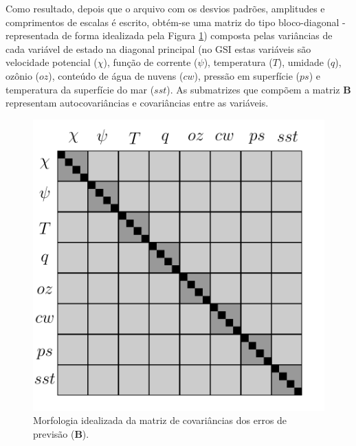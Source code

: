 Como resultado, depois que o arquivo com os desvios padrões, amplitudes e comprimentos de escalas é escrito, obtém-se uma matriz do tipo bloco-diagonal - representada de forma idealizada pela Figura \ref{fig:1}) composta pelas variâncias de cada variável de estado na diagonal principal (no GSI estas variáveis são velocidade potencial ($\chi$), função de corrente ($\psi$), temperatura ($T$), umidade ($q$), ozônio ($oz$), conteúdo de água de nuvens ($cw$), pressão em superfície ($ps$) e temperatura da superfície do mar ($sst$). As submatrizes que compõem a matriz $\mathbf{B}$ representam autocovariâncias e covariâncias entre as variáveis.

\begin{figure}[H]
\caption{Morfologia idealizada da matriz de covariâncias dos erros de previsão ($\mathbf{B}$).}
\vspace{2mm}
\begin{center}
\includegraphics[scale=0.5]{./figs/cap3/matriz_B-new.pdf} 
\end{center}
 \vspace{2mm}
\label{fig:1}
\end{figure}

